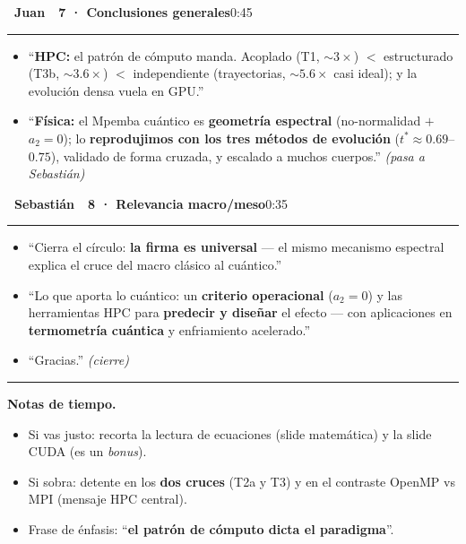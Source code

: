 \documentclass[11pt,a4paper]{article}
\newcommand{\Jb}{\colorbox{juan}{\color{white}\bfseries\footnotesize~Juan~}}
\newcommand{\Sb}{\colorbox{seb}{\color{white}\bfseries\footnotesize~Sebastián~}}
\newcommand{\blk}[3]{%
  \par\medskip\noindent #1\ \textbf{#2}\hfill\textcolor{soft}{\small #3}\par
  \vspace{-4pt}\textcolor{soft!40}{\rule{\linewidth}{0.4pt}}\par\vspace{-2pt}}
\begin{document}
\blk{\Jb}{7 · Conclusiones generales}{0:45}
\begin{itemize}
  \item ``\textbf{HPC:} el patrón de cómputo manda. Acoplado (T1, $\sim3\times$) $<$
    estructurado (T3b, $\sim3.6\times$) $<$ independiente (trayectorias, $\sim5.6\times$
    casi ideal); y la evolución densa vuela en GPU.''
  \item ``\textbf{Física:} el Mpemba cuántico es \textbf{geometría espectral}
    (no-normalidad $+$ $a_2=0$); lo \textbf{reprodujimos con los tres métodos de
    evolución} ($t^*\approx0.69$--$0.75$), validado de forma cruzada, y escalado a
    muchos cuerpos.'' \emph{(pasa a Sebastián)}
\end{itemize}

\blk{\Sb}{8 · Relevancia macro/meso}{0:35}
\begin{itemize}
  \item ``Cierra el círculo: \textbf{la firma es universal} --- el mismo mecanismo
    espectral explica el cruce del macro clásico al cuántico.''
  \item ``Lo que aporta lo cuántico: un \textbf{criterio operacional} ($a_2=0$) y las
    herramientas HPC para \textbf{predecir y diseñar} el efecto --- con aplicaciones en
    \textbf{termometría cuántica} y enfriamiento acelerado.''
  \item ``Gracias.'' \emph{(cierre)}
\end{itemize}

\medskip\hrule\smallskip
\noindent\textbf{\footnotesize Notas de tiempo.}
\begin{itemize}[font=\footnotesize]\footnotesize
  \item Si vas justo: recorta la lectura de ecuaciones (slide matemática) y la slide
    CUDA (es un \emph{bonus}).
  \item Si sobra: detente en los \textbf{dos cruces} (T2a y T3) y en el contraste
    OpenMP vs MPI (mensaje HPC central).
  \item Frase de énfasis: ``\textbf{el patrón de cómputo dicta el paradigma}''.
\end{itemize}
\end{document}
